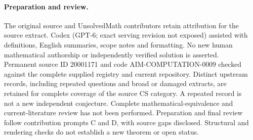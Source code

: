 \documentclass[11pt]{article}
\begin{document}
\paragraph{Preparation and review.}
The original source and UnsolvedMath contributors retain attribution for the source extract. Codex (GPT-6; exact serving revision not exposed) assisted with definitions, English summaries, scope notes and formatting. No new human mathematical authorship or independently verified solution is asserted. Permanent source ID 20001171 and code AIM-COMPUTATION-0009 checked against the complete supplied registry and current repository. Distinct upstream records, including repeated questions and broad or damaged extracts, are retained for complete coverage of the source CS category. A repeated record is not a new independent conjecture. Complete mathematical-equivalence and current-literature review has not been performed. Preparation and final review follow contribution prompts C and D, with source gaps disclosed. Structural and rendering checks do not establish a new theorem or open status.
\label{end:20001171}
\end{document}
